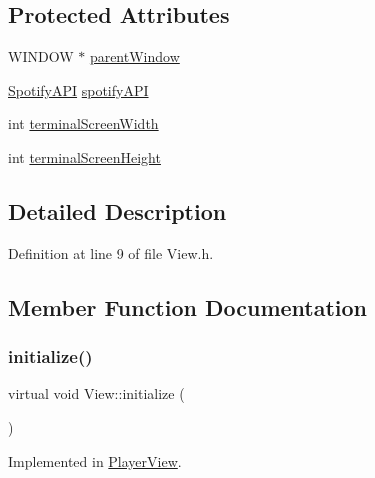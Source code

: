 \subsection*{Protected Attributes}
\begin{DoxyCompactItemize}
\item 
W\+I\+N\+D\+OW $\ast$ \mbox{\hyperlink{class_view_a4a72723c795f9cec173ed1ebb6d5164c}{parent\+Window}}
\item 
\mbox{\hyperlink{class_spotify_a_p_i}{Spotify\+A\+PI}} \mbox{\hyperlink{class_view_ab8fa3bb31350226f8a3abf3e2c80a9c3}{spotify\+A\+PI}}
\item 
int \mbox{\hyperlink{class_view_a1f50d3146f942418e80b1085935e1a05}{terminal\+Screen\+Width}}
\item 
int \mbox{\hyperlink{class_view_a8ed04dfb61219cb59b8e77a2f90db244}{terminal\+Screen\+Height}}
\end{DoxyCompactItemize}


\subsection{Detailed Description}


Definition at line 9 of file View.\+h.



\subsection{Member Function Documentation}
\mbox{\label{class_view_a267f7ca5c1e77fcbc28fd57c90628b7d}} 
\subsubsection{\texorpdfstring{initialize()}{initialize()}}
{\footnotesize\ttfamily virtual void View\+::initialize (\begin{DoxyParamCaption}{ }\end{DoxyParamCaption})\hspace{0.3cm}{\ttfamily [pure virtual]}}



Implemented in \mbox{\hyperlink{class_player_view_a8f41109707205d01009aab96f72d338f}{Player\+View}}.

\mbox{\label{class_view_a48b5a945ec29e4a9a4c98e6da58b9a45}} 
